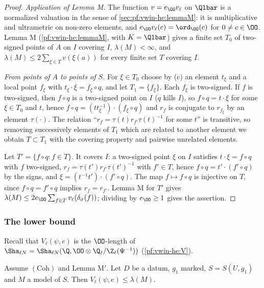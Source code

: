 \begin{proof}
\emph{Application of Lemma M.} The function $v=e_\OO\eisv$ on $\Qlbar$ is a normalized valuation in the sense of
\cref{sec:pf:vwin-he:lemmaM}: it is multiplicative and ultrametric on non-zero elements, and $e_\OO\eisv(c)=\ord_\OO(c)$ for
$0\ne c\in\OO$. Lemma M (\cref{pf:vwin-he:lemmaM}, with $K=\Qlbar$) gives a finite set $T_0$ of two-signed points of $A$ on
$I$ covering $I$, $\lambda(M)<\infty$, and $\lambda(M)\le2\sum_{\xi\in T}v(\xi(a))$ for every finite set $T$ covering $I$.

\emph{From points of $A$ to points of $S$.} For $\xi\in T_0$ choose by (c) an element $t_\xi$ and a local point $f_\xi$ with
$t_\xi\cdot\xi=f_\xi\circ q$, and let $T_1=\{f_\xi\}$. Each $f_\xi$ is two-signed. If $f$ is two-signed, then $f\circ q$ is a
two-signed point on $I$ ($q$ kills $I$), so $f\circ q=t\cdot\xi$ for some $\xi\in T_0$ and $t$, hence
$f\circ q=(tt_\xi^{-1})\cdot(f_\xi\circ q)$ and $r_f$ is conjugate to $r_{f_\xi}$ by an element $\tau(\cdot)$. The relation
``$r_f=\tau(t)r_{f'}\tau(t)^{-1}$ for some $t$'' is transitive, so removing successively elements of $T_1$ which are related to
another element we obtain $T\subset T_1$ with the covering property and pairwise unrelated elements.

Let $T'=\{f\circ q:f\in T\}$. It covers $I$: a two-signed point $\xi$ on $I$ satisfies $t\cdot\xi=f\circ q$ with $f$ two-signed,
$r_f=\tau(t')r_{f'}\tau(t')^{-1}$ with $f'\in T$, hence $f\circ q=t'\cdot(f'\circ q)$ by the signs, and
$\xi=(t^{-1}t')\cdot(f'\circ q)$. The map $f\mapsto f\circ q$ is injective on $T$, since $f\circ q=f'\circ q$ implies $r_f=r_{f'}$.
Lemma M for $T'$ gives $\lambda(M)\le2e_\OO\sum_{f\in T}\eisv(\eistr_\sigma(f))$; dividing by $e_\OO\ge1$ gives the assertion.
\end{proof}

\subsubsection{The lower bound}

Recall that $V_\ell(\psi,e)$ is the $\OO$-length of $\Sha_{\ell N}=\Sha_{\ell N}(\Q,\OO\otimes\eisQZ(\Psi^{-1}))$
(\cref{pf:vwin-he:V}).

\begin{lemma}\label{pf:eis:lower}
Assume $(\mathrm{Coh})$ and Lemma M$'$. Let $D$ be a datum, $g_1$ marked, $S=S(U,g_1)$ and $M$ a model of $S$. Then
$V_\ell(\psi,e)\le\lambda(M)$.
\end{lemma}

